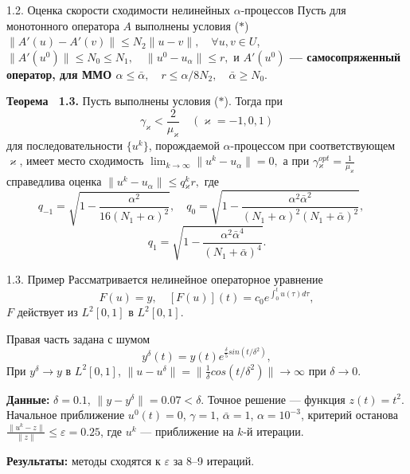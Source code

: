 \documentclass[10pt,pdf, mathserif, hyperref={unicode}]{beamer}
\begin{document}
\begin{frame}{\small 1.2. Оценка скорости сходимости нелинейных $\alpha$-процессов}
		Пусть для монотонного оператора $A$ выполнены условия ($*$) $\|A'(u)-A'(v)\|\leqslant N_2\|u-v\|, \quad \forall u, v \in U$,	$\|A'(u^0)\| \leqslant N_0\leqslant N_1, \quad \|u^0-u_\alpha\| \leqslant r,$ и {\textbf{\color{blue}$A'(u^0)$ --- самосопряженный оператор, для ММО $\alpha \leqslant \bar\alpha, \quad r\leqslant \alpha/8N_2, \quad \bar\alpha \geqslant N_0.$}}
	\begin{block}{\bf Теорема ~1.3.}
		Пусть выполнены условия ($*$). Тогда при
		$$\gamma _\varkappa <\frac{2}{\mu _\varkappa}\quad (\varkappa=-1,0,1)$$
		для последовательности $\{u^k\}$, порождаемой $\alpha$-процессом при соответствующем $\varkappa$, имеет место сходимость $\lim_{k\to\infty}\|u^k-u_\alpha\|=0, $ а при 
		$\gamma{_\varkappa^{opt}}=\frac{1}{\mu_\varkappa}$
		справедлива оценка $\|u^k-u_\alpha\|\leqslant q{_\varkappa^k}r,$ где
		$$
		q_{-1}=\sqrt{1-\frac{\alpha^2}{16(N_1+\alpha)^2}}, \quad q_0=\sqrt{1-\frac{\alpha^2\bar\alpha^2}{(N_1+\alpha)^2(N_1+\bar\alpha)^2}}, \quad $$$$q_1=\sqrt{1-\frac{\alpha^2\bar\alpha^4}{(N_1+\bar\alpha)^4}}.
		$$
	\end{block}
\end{frame}

\begin{frame}{1.3. Пример}
Рассматривается нелинейное операторное уравнение
	$$	F(u)=y, \quad [F(u)](t)=c_0 e^{\int_{0}^{t}u(\tau)d\tau},$$
	$F$ действует из $L^2[0,1]$ в $L^2[0,1]$. 

	
	Правая часть задана с шумом $$y^\delta(t)=y(t)e^{\frac{\delta}{5} sin(t/{\delta}^2)},$$
	При $y^\delta\to y$ в $L^2[0,1]$,  $\|u-u^\delta\|=\|\frac{1}{\delta}cos(t/{\delta}^2)\|\to\infty$ при $\delta\to 0$.
	

	{\textbf{\color{blue}Данные:}} $\delta=0.1$, $\|y-y^{\delta}\|=0.07<\delta$. Точное решение --- функция $z(t)=t^2$. Начальное приближение $u^0(t)=0$, $\gamma=1$, $\bar\alpha=1$, $\alpha=10^{-3}$, критерий останова $\frac{\|u^k-z\|}{\|z\|}\leqslant\varepsilon=0.25$, где $u^k$ --- приближение на $k$-й итерации.
	
	{\textbf{\color{blue}Результаты:}} методы сходятся к $\varepsilon$ за 8--9 итераций.

	\let\thefootnote\relax\let\thefootnote\relax{}
\end{frame}
\end{document}
